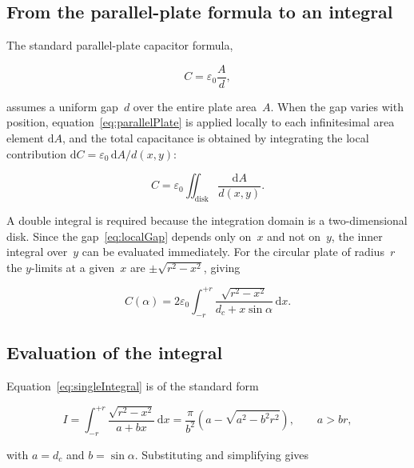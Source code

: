 \documentclass[11pt,a4paper]{article}
\begin{document}
\subsection{From the parallel-plate formula to an integral}

The standard parallel-plate capacitor formula,

\begin{equation}
  C = \varepsilon_0 \frac{A}{d},
  \label{eq:parallelPlate}
\end{equation}

assumes a uniform gap~$d$ over the entire plate area~$A$.  When the gap
varies with position, equation~\eqref{eq:parallelPlate} is applied
locally to each infinitesimal area element $\mathrm{d}A$, and the total
capacitance is obtained by integrating the local contribution
$\mathrm{d}C = \varepsilon_0\,\mathrm{d}A / d(x,y)$:

\begin{equation}
  C = \varepsilon_0 \iint_{\text{disk}} \frac{\mathrm{d}A}{d(x,y)}.
  \label{eq:doubleIntegral}
\end{equation}

A double integral is required because the integration domain is a
two-dimensional disk.  Since the gap~\eqref{eq:localGap} depends only
on~$x$ and not on~$y$, the inner integral over~$y$ can be evaluated
immediately.  For the circular plate of radius~$r$ the $y$-limits at
a given~$x$ are $\pm\sqrt{r^2 - x^2}$, giving

\begin{equation}
  C(\alpha) = 2\varepsilon_0 \int_{-r}^{+r}
              \frac{\sqrt{r^2 - x^2}}{d_c + x\sin\alpha}\,\mathrm{d}x .
  \label{eq:singleIntegral}
\end{equation}

\subsection{Evaluation of the integral}

Equation~\eqref{eq:singleIntegral} is of the standard form

\begin{equation}
  I = \int_{-r}^{+r} \frac{\sqrt{r^2 - x^2}}{a + bx}\,\mathrm{d}x
    = \frac{\pi}{b^2}\!\left(a - \sqrt{a^2 - b^2 r^2}\right),
    \qquad a > br,
  \label{eq:stdIntegral}
\end{equation}

with $a = d_c$ and $b = \sin\alpha$.  Substituting and simplifying gives
\end{document}
